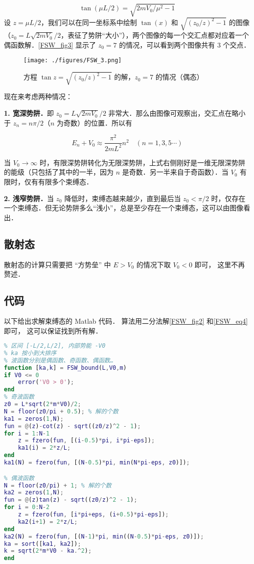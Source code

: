\begin{equation}
\tan(\mu L/2)=\sqrt{2mV_0/\mu^2-1}
\end{equation}
设 $z=\mu L/2$，我们可以在同一坐标系中绘制 $\tan(x)$ 和 $\sqrt{(z_0/z)^2-1}$ 的图像（$z_0=L\sqrt{2mV_0}/2$，表征了势阱“大小”），两个图像的每一个交汇点都对应着一个偶函数解．\autoref{FSW_fig3} 显示了 $z_0=7$ 的情况，可以看到两个图像共有 $3$ 个交点．

\begin{figure}[ht]
\centering
\texttt{[image: ./figures/FSW\_3.png]}
\caption{方程 $\tan z=\sqrt{(z_0/z)^2-1}$ 的解，$z_0=7$ 的情况（偶态）} \label{FSW_fig3}
\end{figure}

现在来考虑两种情况：

\textbf{1. 宽深势阱．}即 $z_0=L\sqrt{2mV_0}/2$ 非常大．那么由图像可观察出，交汇点在略小于 $z_n=n\pi/2$（$n$ 为奇数）的位置．所以有

\begin{equation}
E_n+V_0\approx \frac{\pi^2}{2mL^2}n^2\quad (n=1,3,5\cdots)
\end{equation}

当 $V_0\rightarrow \infty$ 时，有限深势阱转化为无限深势阱，上式右侧刚好是一维无限深势阱的能级（只包括了其中的一半，因为 $n$ 是奇数．另一半来自于奇函数）．当 $V_0$ 有限时，仅有有限多个束缚态．

\textbf{2. 浅窄势阱．}当 $z_0$ 降低时，束缚态越来越少，直到最后当 $z_0<\pi/2$ 时，仅存在一个束缚态．但无论势阱多么“浅小”，总是至少存在一个束缚态，这可以由图像看出．

\subsection{散射态}

散射态的计算只需要把 “方势垒” 中 $E > V_0$ 的情况下取 $V_0 < 0$ 即可， 这里不再赘述．

\subsection{代码}
以下给出求解束缚态的 Matlab 代码． 算法用二分法解\autoref{FSW_fig2} 和\autoref{FSW_eq4} 即可， 这可以保证找到所有解．

\begin{lstlisting}[language=matlab, caption=FSW\_bound.m]
% 有限深势阱的束缚态
% 区间 [-L/2,L/2], 内部势能 -V0
% ka 按小到大排序
% 波函数分别是偶函数、奇函数、偶函数…
function [ka,k] = FSW_bound(L,V0,m)
if V0 <= 0
    error('V0 > 0');
end
% 奇波函数
z0 = L*sqrt(2*m*V0)/2;
N = floor(z0/pi + 0.5); % 解的个数
ka1 = zeros(1,N);
fun = @(z)-cot(z) - sqrt((z0/z)^2 - 1);
for i = 1:N-1
    z = fzero(fun, [(i-0.5)*pi, i*pi-eps]);
    ka1(i) = 2*z/L;
end
ka1(N) = fzero(fun, [(N-0.5)*pi, min(N*pi-eps, z0)]);

% 偶波函数
N = floor(z0/pi) + 1; % 解的个数
ka2 = zeros(1,N);
fun = @(z)tan(z) - sqrt((z0/z)^2 - 1);
for i = 0:N-2
    z = fzero(fun, [i*pi+eps, (i+0.5)*pi-eps]);
    ka2(i+1) = 2*z/L;
end
ka2(N) = fzero(fun, [(N-1)*pi, min((N-0.5)*pi-eps, z0)]);
ka = sort([ka1, ka2]);
k = sqrt(2*m*V0 - ka.^2);
end
\end{lstlisting}
